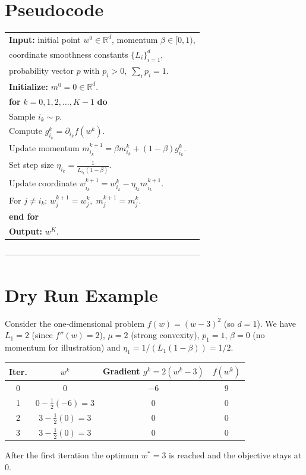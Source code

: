 \documentclass{article}
\newcommand{\R}{\mathbb{R}}
\begin{document}
\section*{Pseudocode}
\begin{center}
\begin{tabular}{l}
\hline
\textbf{Input:}  initial point \(w^{0}\in\R^{d}\), momentum \(\beta\in[0,1)\),\\
\qquad\qquad   coordinate smoothness constants \(\{L_{i}\}_{i=1}^{d}\),\\
\qquad\qquad   probability vector \(p\) with \(p_{i}>0,\;\sum_{i}p_{i}=1\).\\
\textbf{Initialize:}  \(m^{0}=0\in\R^{d}\).\\
\textbf{for} \(k=0,1,2,\dots ,K-1\) \textbf{do}\\
\qquad Sample \(i_{k}\sim p\).\\
\qquad Compute \(g_{i_{k}}^{k}= \partial_{i_{k}}f(w^{k})\).\\
\qquad Update momentum \(\displaystyle 
        m_{i_{k}}^{k+1}= \beta m_{i_{k}}^{k}+(1-\beta)g_{i_{k}}^{k}\).\\
\qquad Set step size \(\displaystyle \eta_{i_{k}}=
        \frac{1}{L_{i_{k}}(1-\beta)}\).\\
\qquad Update coordinate 
        \(\displaystyle w_{i_{k}}^{k+1}= w_{i_{k}}^{k}-\eta_{i_{k}}m_{i_{k}}^{k+1}\).\\
\qquad For \(j\neq i_{k}\): \(w_{j}^{k+1}=w_{j}^{k},\;m_{j}^{k+1}=m_{j}^{k}\).\\
\textbf{end for}\\
\textbf{Output:} \(w^{K}\).\\
\hline
\end{tabular}
\end{center}

-----------------------------------------------------------------------

\section*{Dry Run Example}
Consider the one‑dimensional problem  
\(f(w)=(w-3)^{2}\) (so \(d=1\)).  
We have \(L_{1}=2\) (since \(f''(w)=2\)), \(\mu=2\) (strong convexity),  
\(p_{1}=1\), \(\beta=0\) (no momentum for illustration) and
\(\eta_{1}=1/(L_{1}(1-\beta))=1/2\).

\begin{center}
\begin{tabular}{c|c|c|c}
\textbf{Iter.} & \(w^{k}\) & Gradient \(g^{k}=2(w^{k}-3)\) & \(f(w^{k})\)\\\hline
0 & 0 & \(-6\) & 9\\
1 & \(0-\frac12(-6)=3\) & \(0\) & 0\\
2 & \(3-\frac12(0)=3\) & \(0\) & 0\\
3 & \(3-\frac12(0)=3\) & \(0\) & 0\\
\end{tabular}
\end{center}
After the first iteration the optimum \(w^{*}=3\) is reached and the
objective stays at 0.
\end{document}
